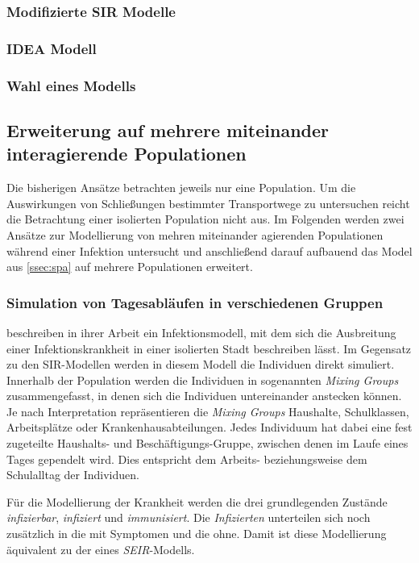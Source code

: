 \subsubsection{Modifizierte SIR Modelle}
\subsubsection{IDEA Modell}
\subsubsection{Wahl eines Modells}
\subsection{Erweiterung auf mehrere miteinander interagierende Populationen}\label{ssec:multiPop}
\steffen
Die bisherigen Ansätze betrachten jeweils nur eine Population. Um die Auswirkungen von Schließungen bestimmter Transportwege zu untersuchen reicht die Betrachtung einer isolierten Population nicht aus. Im Folgenden werden zwei Ansätze zur Modellierung von mehren miteinander agierenden Populationen während einer Infektion untersucht und anschließend darauf aufbauend das Model aus \ref{ssec:spa} auf mehrere Populationen erweitert.
\subsubsection{Simulation von Tagesabläufen in verschiedenen Gruppen}
\cite{Capasso1978} beschreiben in ihrer Arbeit ein Infektionsmodell, mit dem sich die Ausbreitung einer Infektionskrankheit in einer isolierten Stadt beschreiben lässt. Im Gegensatz zu den SIR-Modellen werden in diesem Modell die Individuen direkt simuliert. Innerhalb der Population werden die Individuen in sogenannten \emph{Mixing Groups} zusammengefasst, in denen sich die Individuen untereinander anstecken können. Je nach Interpretation repräsentieren die \emph{Mixing Groups} Haushalte, Schulklassen, Arbeitsplätze oder Krankenhausabteilungen. Jedes Individuum hat dabei eine fest zugeteilte Haushalts- und Beschäftigungs-Gruppe, zwischen denen im Laufe eines Tages gependelt wird. Dies entspricht dem Arbeits- beziehungsweise dem Schulalltag der Individuen.

Für die Modellierung der Krankheit werden die drei grundlegenden Zustände \emph{infizierbar}, \emph{infiziert} und \emph{immunisiert}. Die \emph{Infizierten} unterteilen sich noch zusätzlich in die mit Symptomen und die ohne. Damit ist diese Modellierung äquivalent zu der eines \emph{SEIR}-Modells.


